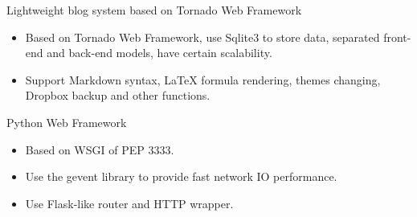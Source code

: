 \documentclass{resume}
\newcommand{\en}[1]{#1}
\newcommand{\zh}[1]{}
\begin{document}
\en{Lightweight blog system based on Tornado Web Framework}
\zh{基于 Tornado Web Framework 的轻量级博客系统}
\begin{itemize}
      \item \en{Based on Tornado Web Framework, use Sqlite3 to store data, separated front-end and back-end models, have certain scalability.}
            \zh{基于 Tornado Web Framework 开发，使用 Sqlite3 存储数据，前后端分离，有一定扩展性}
      \item \en{Support Markdown syntax, LaTeX formula rendering, themes changing, Dropbox backup and other functions.}
            \zh{支持Markdown语法，LaTeX公式渲染，主题更换以及Dropbox备份等功能}
\end{itemize}

\en{Python Web Framework}
\zh{Python Web 框架}
\begin{itemize}
      \item \en{Based on WSGI of PEP 3333.}
            \zh{基于 PEP 3333 的 WSGI 实现}
      \item \en{Use the gevent library to provide fast network IO performance.}
            \zh{使用 gevent 库提供快速的网络 IO 表现}
      \item \en{Use Flask-like router and HTTP wrapper.}
            \zh{使用了类 Flask 的路由功能和 HTTP 封装}
\end{itemize}

\end{document}

